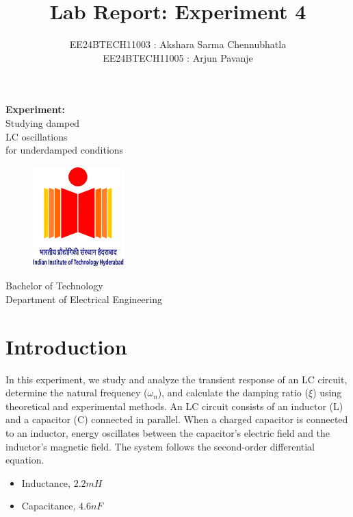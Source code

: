 \documentclass[a4paper,12pt]{article}
\title{\textbf{Lab Report: Experiment 4}}
\author{EE24BTECH11003 : Akshara Sarma Chennubhatla\\EE24BTECH11005 : Arjun Pavanje}
\begin{document}
\maketitle
\begin{center}
	\textbf{Experiment:}\\Studying damped\\LC oscillations\\for underdamped conditions
\end{center}
\vspace{30pt}
\begin{figure}[h!]
	\centering
	\includegraphics[width = 100pt]{.logo/logo.png}\\
\end{figure}
\begin{center}
	Bachelor of Technology\\
	\vspace{10pt}
	Department of Electrical Engineering\\
\end{center}
\newpage

\section{Introduction}
In this experiment, we study and analyze the transient response of an LC circuit, determine the natural frequency ($\omega_n$), and calculate the damping ratio ($\xi$) using theoretical and experimental methods. \newline An LC circuit consists of an inductor (L) and a capacitor (C) connected in parallel. When a charged capacitor is connected to an inductor, energy oscillates between the capacitor's electric field and the inductor's magnetic field. The system follows the second-order differential equation.

\begin{itemize}
    \item Inductance, $2.2 mH$ 
    \item Capacitance, $ 4.6 nF $
\end{itemize}
\end{document}
